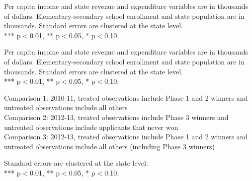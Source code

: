 \documentclass[12pt]{article}
\begin{document}
\begin{table}[h!]
\small
\caption*{\bf Table 3: Assessments of RttT Influence by State Legislators}

\end{table}
\clearpage

\begin{landscape}
\begin{table}[h!]
\footnotesize
\caption*{\bf Table 4: RttT Policy Enactment among Winners and Losers}

\begin{minipage}{\textwidth} 
{\footnotesize Per capita income and state revenue and expenditure variables are in thousands of dollars. Elementary-secondary school enrollment and state population are in thousands. Standard errors are clustered at the state level. \\
 *** p$<$0.01, ** p$<$0.05, * p$<$0.10.}
\end{minipage}
\end{table}
\end{landscape}
\clearpage

\begin{table}[h!]
\footnotesize
\caption*{\bf Table 5: Linking RttT Policy Enactments to Application Promises}

\vspace{2mm}
\begin{minipage}{.85\textwidth} 
{\footnotesize Per capita income and state revenue and expenditure variables are in thousands of dollars. Elementary-secondary school enrollment and state population are in thousands. Standard errors are clustered at the state level. \\
 *** p$<$0.01, ** p$<$0.05, * p$<$0.10.}
\end{minipage}
\end{table}
\clearpage

\begin{table}[h!]
\footnotesize
\captionsetup{justification=centering}
\caption*{\bf Table 6: Average Treatment Effect on the Treated \\ Exact Matching on Year and Policy Domain, Nearest Neighbor Matching on Section Score}
Comparison 1: 2010-11, treated observations include Phase 1 and 2 winners and untreated observations include all others \\

\vspace{5mm}
Comparison 2: 2012-13, treated observations include Phase 3 winners and untreated observations include applicants that never won \\

\vspace{5mm}
Comparison 3: 2012-13, treated observations include Phase 1 and 2 winners and untreated observations include all others (including Phase 3 winners) \\

\vspace{2mm}
\begin{minipage}{\textwidth} 
{\footnotesize Standard errors are clustered at the state level. \\
 *** p$<$0.01, ** p$<$0.05, * p$<$0.10.}
\end{minipage}
\end{table}
\clearpage
\end{document}
